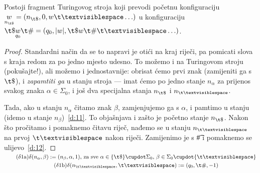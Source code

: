 \begin{lema}[{name=[prvi fragment transpiliranog stroja]}]\label{lm:faza1}
    Postoji fragment Turingovog stroja koji prevodi početnu konfiguraciju $\underset{n_{\t\$}}{w}=(n_{\t\$},0,w\bl\ldots)$ u konfiguraciju $\t\$\underset{q_0}{w}\t\#=(q_0,\dulj{w},\t\$w\t\#\bl\ldots)$.
\end{lema}
\begin{proof}
    Standardni način da se to napravi je otići na kraj riječi, pa pomicati slova s kraja redom za po jedno mjesto udesno. To možemo i na Turingovom stroju (pokušajte!), ali možemo i jednostavnije: obrisat ćemo prvi znak (zamijeniti ga s $\t\$$), i \emph{zapamtiti ga} u stanju stroja --- imat ćemo po jedno stanje $n_\alpha$ za prijenos svakog znaka $\alpha\in\Sigma_0$, i još dva specijalna stanja $n_{\t\$}$ i $n_{\bl}$.

    Tada, ako u stanju $n_\alpha$ čitamo znak $\beta$, zamjenjujemo ga s $\alpha$, i pamtimo u stanju (idemo u stanje $n_\beta$)~\eqref{d:11}. To objašnjava i zašto je početno stanje $n_{\t\$}$. Nakon što pročitamo i pomaknemo čitavu riječ, nađemo se u stanju $n_{\bl}$ na prvoj $\bl$ nakon riječi. Zamijenimo je s \t\# i pomaknemo se ulijevo~\eqref{d:12}.
\end{proof}
\noindent\begin{gather*}
    \SwapAboveDisplaySkip
\label{d:11}\tag{$\delta$1a}
    \delta(n_\alpha,\beta):=(n_{\beta},\alpha,1)\text{, za sve }\alpha\in\{\t\$\}\dcup\Sigma_0\text{, }\beta\in\Sigma_0\dcup\{\bl\}\\
\label{d:12}\tag{$\delta$1b}
    \delta(n_{\bl},\bl):=(q_0,\t\#,-1)
\end{gather*}

